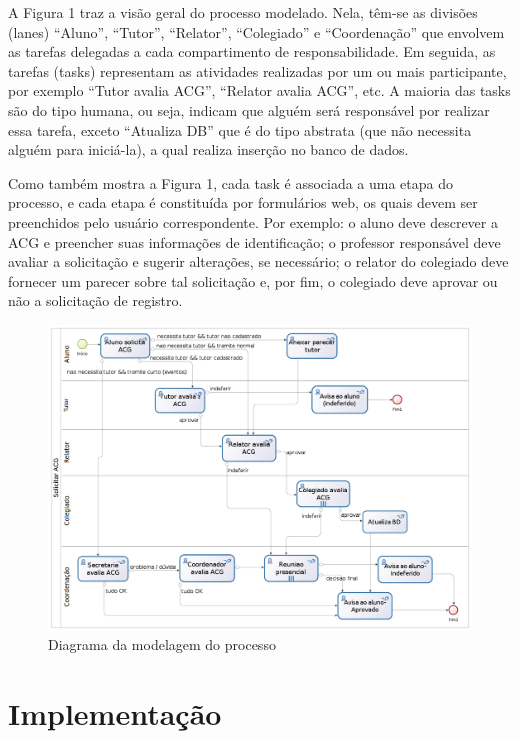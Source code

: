 \documentclass[12pt]{article}
\begin{document}
	A Figura 1 traz a visão geral do processo modelado. Nela, têm-se as divisões (lanes) “Aluno”, “Tutor”, “Relator”, “Colegiado” e “Coordenação” que envolvem as tarefas delegadas a cada compartimento de responsabilidade. Em seguida, as tarefas  (tasks)  representam as atividades realizadas por um ou mais participante, por exemplo “Tutor avalia ACG”, “Relator avalia ACG”, etc. A maioria das tasks são  do tipo humana, ou seja, indicam que alguém será responsável por realizar essa tarefa, exceto “Atualiza DB” que é do tipo abstrata (que não necessita alguém para iniciá-la), a qual realiza inserção no banco de dados.

Como também mostra a Figura 1, cada  task  é associada a uma etapa do processo, e cada etapa é constituída  por formulários web, os quais devem ser preenchidos pelo usuário correspondente. Por exemplo: o aluno deve  descrever  a ACG e preencher  suas  informações  de  identificação;  o professor responsável deve avaliar a solicitação e sugerir alterações, se necessário; o relator do colegiado deve fornecer um parecer sobre tal solicitação e, por fim, o colegiado deve aprovar ou não a solicitação de registro.

\begin{figure}[ht]
\centering
\includegraphics[width=.99\textwidth]{images/processo.png}
\caption{Diagrama da modelagem do processo}
\label{fig:Fig1}
\end{figure}

\section{Implementação}
\end{document}
